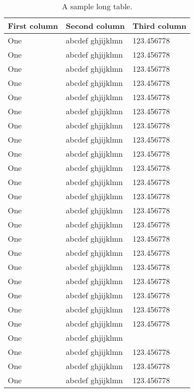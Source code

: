 \documentclass[12pt]{ctexart}
\begin{document}
\begin{center}
    \begin{longtable}{|l|l|l|}
    \caption{A sample long table.} \label{tab:long} \\
    
    \hline \multicolumn{1}{|c|}{\textbf{First column}} & \multicolumn{1}{c|}{\textbf{Second column}} & \multicolumn{1}{c|}{\textbf{Third column}} \\ \hline 
    \endfirsthead

    \hline \hline
    \endlastfoot
    
    One & abcdef ghjijklmn & 123.456778 \\
    One & abcdef ghjijklmn & 123.456778 \\
    One & abcdef ghjijklmn & 123.456778 \\
    One & abcdef ghjijklmn & 123.456778 \\
    One & abcdef ghjijklmn & 123.456778 \\
    One & abcdef ghjijklmn & 123.456778 \\
    One & abcdef ghjijklmn & 123.456778 \\
    One & abcdef ghjijklmn & 123.456778 \\
    One & abcdef ghjijklmn & 123.456778 \\
    One & abcdef ghjijklmn & 123.456778 \\
    One & abcdef ghjijklmn & 123.456778 \\
    One & abcdef ghjijklmn & 123.456778 \\
    One & abcdef ghjijklmn & 123.456778 \\
    One & abcdef ghjijklmn & 123.456778 \\
    One & abcdef ghjijklmn & 123.456778 \\
    One & abcdef ghjijklmn & 123.456778 \\
    One & abcdef ghjijklmn & 123.456778 \\
    One & abcdef ghjijklmn & 123.456778 \\
    One & abcdef ghjijklmn & 123.456778 \\
    One & abcdef ghjijklmn & 123.456778 \\
    One & abcdef ghjijklmn & 123.456778 \\
    One & abcdef ghjijklmn & \\
    One & abcdef ghjijklmn & 123.456778 \\
    One & abcdef ghjijklmn & 123.456778 \\
    One & abcdef ghjijklmn & 123.456778 \\

\end{longtable}
\end{center}
\end{document}
